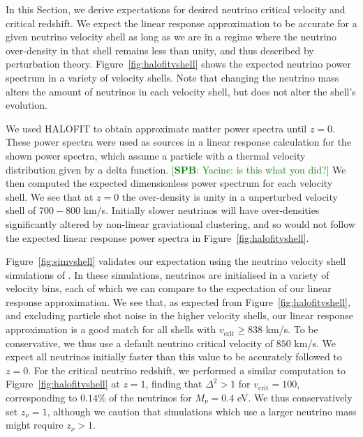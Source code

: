 \documentclass[useAMS, usenatbib]{mnras}
\newcommand{\barr}{\begin{eqnarray}}
\newcommand{\earr}{\end{eqnarray}}
\newcommand{\spb}[1]{{\textcolor{green}{[{\bf SPB}: #1]}}}
\begin{document}
In this Section, we derive expectations for desired neutrino critical velocity and critical redshift.
We expect the linear response approximation to be accurate for a given neutrino velocity shell as long
as we are in a regime where the neutrino over-density in that shell remains less than unity, and thus described by perturbation theory. Figure~\ref{fig:halofitvshell} shows the expected neutrino power spectrum in a variety of velocity shells. Note that changing the neutrino mass alters the amount of neutrinos in each velocity shell, but does not alter the shell's evolution.

We used {\small HALOFIT} \cite{Smith_2003} to obtain approximate matter power spectra until $z=0$. These power spectra were used as sources in a linear response calculation for the shown power spectra, which assume a particle with a thermal velocity distribution given by a delta function. \spb{Yacine: is this what you did?} We then computed the expected dimensionless power spectrum for each velocity shell. We see that at $z=0$ the over-density is unity in a unperturbed velocity shell of $700 - 800$ km/s. Initially slower neutrinos will have over-densities significantly altered by non-linear graviational clustering, and so would not follow the expected linear response power spectra in Figure~\ref{fig:halofitvshell}.

Figure~\ref{fig:simvshell} validates our expectation using the neutrino velocity shell simulations of \cite{Banerjee_2018}. In these simulations, neutrinos are initialised in a variety of velocity bins, each of which we can compare to the expectation of our linear response approximation. We see that, as expected from Figure~\ref{fig:halofitvshell}, and excluding particle shot noise in the higher velocity shells, our linear response approximation is a good match for all shells with $v_\mathrm{crit} \geq 838$ km/s. To be conservative, we
thus use a default neutrino critical velocity of $850$ km/s. We expect all neutrinos initially faster than this value to be accurately followed to $z=0$. For the critical neutrino redshift, we performed a similar computation to Figure~\ref{fig:halofitvshell} at $z=1$, finding that $\Delta^2 > 1$ for $v_\mathrm{crit} = 100$, corresponding to $0.14\%$ of the neutrinos for $M_\nu  = 0.4$ eV. We thus conservatively set $z_\nu = 1$, although we caution that simulations which use a larger neutrino mass might require $z_\nu > 1$.

\end{document}
